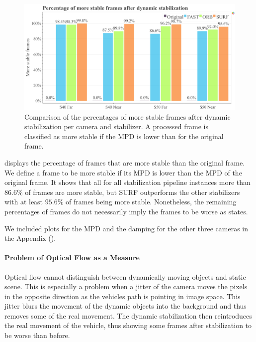 \begin{figure}[!ht]
      \includegraphics[width=\linewidth]{diagrams/optical_flow/stats.html.png}    
    \caption{
        Comparison of the percentages of more stable frames after dynamic stabilization per camera and stabilizer.
        A processed frame is classified as more stable if the MPD is lower than for the original frame. 
    }
    \label{fig:dynamic_stabilization}
\end{figure}

 displays the percentage of frames that are more stable than the original frame.
We define a frame to be more stable if its MPD is lower than the MPD of the original frame. 
It shows that all for all stabilization pipeline instances more than $86.6\%$ of frames are more stable, but SURF outperforms the other stabilizers with at least $95.6\%$ of frames being more stable.
Nonetheless, the remaining percentages of frames do not necessarily imply the frames to be worse as  states.

We included plots for the MPD and the damping for the other three cameras in the Appendix ().




\paragraph{Problem of Optical Flow as a Measure}
\label{sec:dynamic_stabilization_evaluation_optical_flow_problem}
Optical flow cannot distinguish between dynamically moving objects and static scene.
This is especially a problem when a jitter of the camera moves the pixels in the opposite direction as the vehicles path is pointing in image space.
This jitter blurs the movement of the dynamic objects into the background and thus removes some of the real movement.
The dynamic stabilization then reintroduces the real movement of the vehicle, thus showing some frames after stabilization to be worse than before. 

